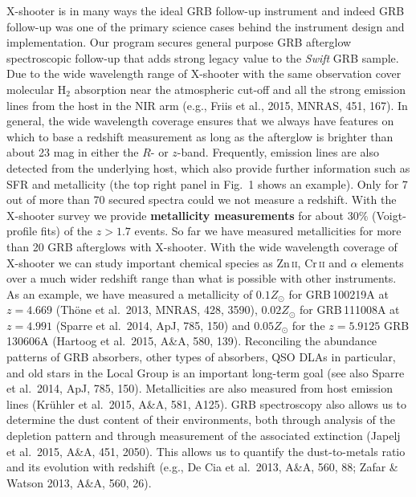 X-shooter is in many ways
the ideal GRB follow-up instrument and indeed GRB follow-up was one of the
primary science cases behind the instrument design and implementation. Our
program secures general purpose GRB afterglow spectroscopic follow-up 
that adds strong legacy value to the \textit{Swift} GRB sample.
Due to the wide wavelength range of X-shooter  
with the same observation cover molecular H$_2$ absorption near the
atmospheric cut-off and all the strong emission lines from the host in the
NIR arm (e.g., Friis et al., 2015, MNRAS, 451, 167). In general, the wide wavelength coverage ensures that we always have
features on which to base a redshift measurement as long as the afterglow is
brighter than about 23 mag in either the $R$- or $z$-band. 
Frequently, emission lines are also detected from the underlying host, which
also provide further information such as SFR and metallicity (the top right 
panel in Fig.~1 shows an example). Only for 
7 out of more than 70 secured spectra could we not measure a redshift.   
With the X-shooter survey we
provide {\bf metallicity measurements} for about 30\% (Voigt-profile fits)
of the $z>1.7$ events.
So far we have
measured metallicities for more than 20 GRB afterglows with X-shooter.
With the wide wavelength coverage of X-shooter we can
study important chemical species as Zn\,\textsc{ii}, Cr\,\textsc{ii} and $\alpha$
elements over a much wider redshift range than what is possible with other
instruments.
As an example, we have measured a metallicity of $0.1 Z_\odot$ for GRB\,100219A
at $z=4.669$ (Th{\"o}ne et al.\ 2013, MNRAS, 428, 3590), $0.02Z_\odot$ for 
GRB\,111008A at $z=4.991$ (Sparre et al.\ 2014, ApJ, 785, 150) and $0.05Z_\odot$
for the $z=5.9125$ GRB\,130606A (Hartoog et al.\ 2015, A\&A, 580, 139).  
Reconciling the
abundance patterns of GRB absorbers, other types of absorbers, QSO DLAs
in particular, and old stars in the Local Group is an important long-term
goal (see also Sparre et al.\ 2014, ApJ, 785, 150).
Metallicities are also measured from host emission lines (Kr{\"u}hler et al.\ 2015,
A\&A, 581, A125).
GRB spectroscopy also allows us to determine the dust content of their environments,
both through analysis of the depletion pattern and through measurement of the
associated extinction (Japelj et al.\ 2015, A\&A, 451, 2050). 
This allows us to quantify the dust-to-metals ratio and its
evolution with redshift (e.g., De Cia et al.\ 2013, A\&A, 560, 88; Zafar \&
Watson 2013, A\&A, 560, 26).

